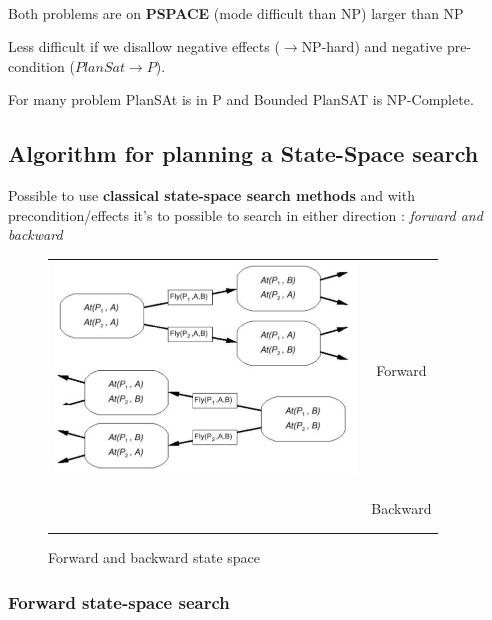 \paragraph{ } Both problems are on \textbf{PSPACE} (mode difficult than NP) larger than NP

Less difficult if we disallow negative effects ($\to $NP-hard) and negative
pre-condition ($PlanSat \to P$).

For many problem PlanSAt is in P and Bounded PlanSAT is NP-Complete.

\subsection{Algorithm for planning a State-Space search}

Possible to use \textbf{classical state-space search methods} and with
precondition/effects it's to possible to search in either direction :
\textit{forward and backward}

\begin{figure}[h]
    \centering
    \begin{tabular}{cc}
        \multirow{5}{*}{
            \includegraphics[width=8cm]{state_space.png} }
            & \\& \\& Forward \\ & \\& \\ & \\&\\&
            \\&  Backward \\& \\ &\\
        \end{tabular}
    \caption{Forward and backward state space}
\end{figure}

\subsubsection{Forward state-space search}

